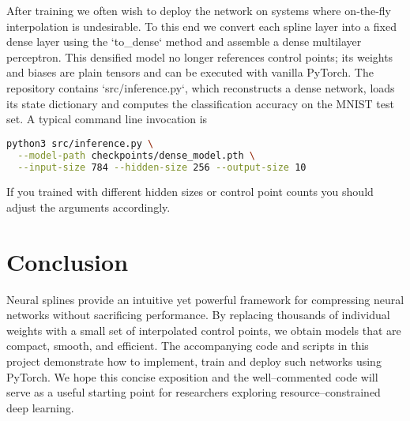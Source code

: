 \documentclass[12pt]{article}
\begin{document}
After training we often wish to deploy the network on systems where
on‑the‑fly interpolation is undesirable.  To this end we convert each
spline layer into a fixed dense layer using the `to\_dense` method and
assemble a dense multilayer perceptron.  This densified model no
longer references control points; its weights and biases are plain
tensors and can be executed with vanilla PyTorch.  The repository
contains `src/inference.py`, which reconstructs a dense network, loads
its state dictionary and computes the classification accuracy on the
MNIST test set.  A typical command line invocation is

\begin{lstlisting}[language=bash, caption={Running inference with the densified model.}]
python3 src/inference.py \
  --model-path checkpoints/dense_model.pth \
  --input-size 784 --hidden-size 256 --output-size 10
\end{lstlisting}

If you trained with different hidden sizes or control point counts you
should adjust the arguments accordingly.

\section{Conclusion}

Neural splines provide an intuitive yet powerful framework for compressing neural networks
without sacrificing performance.  By replacing thousands of individual weights with a small set
of interpolated control points, we obtain models that are compact, smooth, and efficient.  The
accompanying code and scripts in this project demonstrate how to implement, train and deploy
such networks using PyTorch.  We hope this concise exposition and the
well–commented code will serve as a useful starting point for researchers exploring
resource–constrained deep learning.
\end{document}
